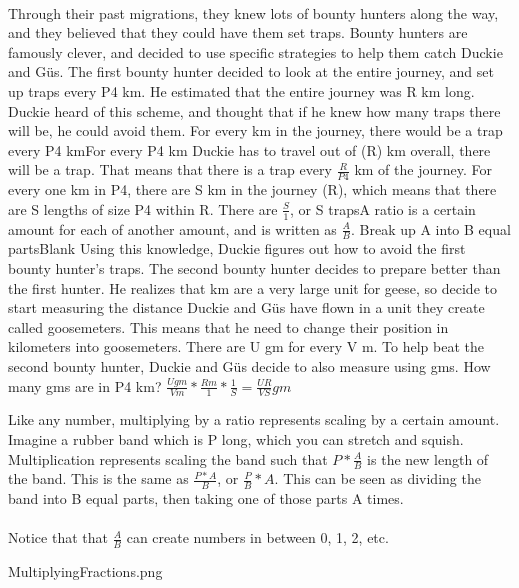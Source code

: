 \documentclass[a4paper,11pt ]{book}
\begin{document}
\paragraph{} Through their past migrations, they knew lots of bounty hunters along the way, and they believed that they could have them set traps. Bounty hunters are famously clever, and decided to use specific strategies to help them catch Duckie and Güs.
\vfill
\pagebreak
{The first bounty hunter decided to look at the entire journey, and set up traps every P4 km. He estimated that the entire journey was R km long. Duckie heard of this scheme, and thought that if he knew how many traps there will be, he could avoid them. For every km in the journey, there would be a trap every P4 km}{For every P4 km Duckie has to travel out of (R) km overall, there will be a trap. That means that there is a trap every $\frac{R}{P4}$ km of the journey. For every one km in P4, there are S km in the journey (R), which means that there are S lengths of size P4 within R. There are $\frac{S}{1}$, or S traps}{A ratio is a certain amount for each of another amount, and is written as $\frac{A}{B}$. Break up A into B equal parts}{Blank}
{Using this knowledge, Duckie figures out how to avoid the first bounty hunter's traps. The second bounty hunter decides to prepare better than the first hunter. He realizes that km are a very large unit for geese, so decide to start measuring the distance Duckie and Güs have flown in a unit they create called goosemeters. This means that he need to change their position in kilometers into goosemeters. There are U gm for every V m. To help beat the second bounty hunter, Duckie and Güs decide to also measure using gms. How many gms are in P4 km?}{
$\frac{Ugm}{Vm}*\frac{Rm}{1}*\frac{1}{S}=\frac{UR}{VS} gm$
}{Like any number, multiplying by a ratio represents scaling by a certain amount. Imagine a rubber band which is P long, which you can stretch and squish. Multiplication represents scaling the band such that $P*\frac{A}{B}$ is the new length of the band. This is the same as $\frac{P*A}{B}$, or $\frac{P}{B}*A$. This can be seen as dividing the band into B equal parts, then taking one of those parts A times. \paragraph{} Notice that that $\frac{A}{B}$ can create numbers in between 0, 1, 2, etc.}{MultiplyingFractions.png}
\end{document}
